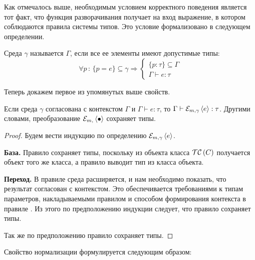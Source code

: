 Как отмечалось выше, необходимым условием корректного поведения является тот факт, что функция разворачивания получает на вход выражение, в котором соблюдаются правила системы типов. Это условие формализовано в следующем определении.

\begin{Def}\label{agree}
Среда $\gamma$ называется  $\Gamma$, если все ее элементы имеют допустимые типы:
$$
	\forall p \, : \, 
		\{p = e\} \subseteq \gamma 
			\Rightarrow 
		\left\{\begin{array}{l}		
		\{p : \tau\} \subseteq \Gamma \\
		\Gamma \vdash e : \tau
		\end{array}\right.
$$
\end{Def}

Теперь докажем первое из упомянутых выше свойств.

\begin{Th}\label{ThTP}
Если среда $\gamma$ согласована с контекстом $\Gamma$ и \mbox{$\Gamma \vdash e : \tau$}, то \mbox{$\Gamma \vdash \mathcal{E}_{m, \gamma} \left\langle e \right\rangle : \tau$}. Другими словами, преобразование $\mathcal{E}_{m, } \left\langle \bullet \right\rangle$ сохраняет типы.
\end{Th}
\begin{proof}
Будем вести индукцию по определению $\mathcal{E}_{m, \gamma} \left\langle e \right\rangle$.

\noindent\textbf{База.} Правило  сохраняет типы, поскольку из объекта класса $\mathcal{TC}\left(C\right)$ получается объект того же класса, а правило  выводит тип из класса объекта.

\noindent\textbf{Переход.} 
В правиле  среда расширяется, и нам необходимо показать, что результат согласован с контекстом. Это обеспечивается требованиями к типам параметров, накладываемыми правилом  и способом формирования контекста в правиле . Из этого по предположению индукции следует, что правило  сохраняет типы.

Так же по предположению правило  сохраняет типы.
\end{proof}

Свойство нормализации формулируется следующим образом:

